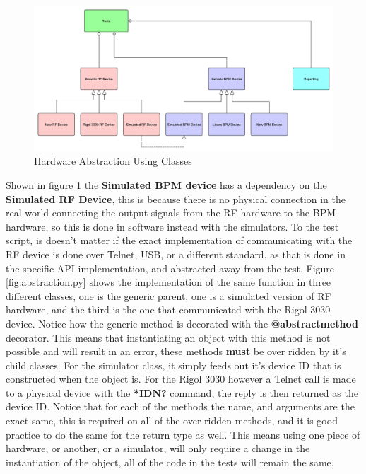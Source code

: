 \documentclass[a4paper, 11pt]{article}
\begin{document}
\begin{figure}[H]%
	\centering%
	\includegraphics[width=1\textwidth]{HardwareAbstraction.pdf}%
	\caption{Hardware Abstraction Using Classes}%
    \label{fig:HardwareAbstraction}
\end{figure}
Shown in figure \ref{fig:HardwareAbstraction} the \textbf{Simulated BPM device} has a dependency on the \textbf{Simulated RF Device}, this is because there is no physical connection in the real world connecting the output signals from the RF hardware to the BPM hardware, so this is done in software instead with the simulators. 
To the test script, is doesn't matter if the exact implementation of communicating with the RF device is done over Telnet, USB, or a different standard, as that is done in the specific API implementation, and abstracted away from the test. Figure \ref{fig:abstraction.py} shows the implementation of the same function in three different classes, one is the generic parent, one is a simulated version of RF hardware, and the third is the one that communicated with the Rigol 3030 device. Notice how the generic method is decorated with the \textbf{@abstractmethod} decorator. This means that instantiating an object with this method is not possible and will result in an error, these methods \textbf{must} be over ridden by it's child classes. For the simulator class, it simply feeds out it's device ID that is constructed when the object is. For the Rigol 3030 however a Telnet call is made to a physical device with the \textbf{*IDN?} command, the reply is then returned as the device ID. Notice that for each of the methods the name, and arguments are the exact same, this is required on all of the over-ridden methods, and it is good practice to do the same for the return type as well.  This means using one piece of hardware, or another, or a simulator, will only require a change in the instantiation of the object, all of the code in the tests will remain the same. 
\end{document}

